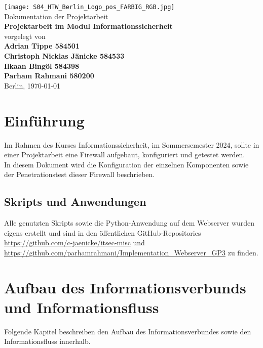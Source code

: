 \documentclass[
    a4paper,
    pagesize,
	pdftex,
    12pt,
]{scrartcl}
\begin{document}
\begin{titlepage}
    \begin{center}
        \texttt{[image: S04\_HTW\_Berlin\_Logo\_pos\_FARBIG\_RGB.jpg]} \\
        \vspace{1.0cm}
        Dokumentation der Projektarbeit \\
        \vspace{1.5cm}   
        \textbf{Projektarbeit im Modul Informationssicherheit} \\
        \vspace{1.5cm}
        vorgelegt von \\
        \textbf{Adrian Tippe 584501} \\
        \textbf{Christoph Nicklas Jänicke 584533} \\
        \textbf{Ilkaan Bingöl 584398} \\
        \textbf{Parham Rahmani 580200} \\
        \vspace{1.5cm}    
        Berlin, \today\\
    \end{center}
\end{titlepage}


\thispagestyle{empty}
\tableofcontents
\newpage


\section{Einführung}
Im Rahmen  des  Kurses Informationssicherheit,  im Sommersemester 2024, sollte in einer Projektarbeit eine Firewall aufgebaut,  konfiguriert  und getestet werden. \\
In  diesem Dokument wird die Konfiguration  der  einzelnen Komponenten sowie der Penetrationstest dieser Firewall beschrieben.

\subsection{Skripts und Anwendungen}
Alle genutzten Skripts sowie die Python-Anwendung auf dem Webserver wurden eigens erstellt und sind in den öffentlichen GitHub-Repositories \url{https://github.com/c-jaenicke/itsec-misc} und \url{https://github.com/parhamrahmani/Implementation_Webserver_GP3} zu finden.

\newpage
\section{Aufbau des Informationsverbunds und Informationsfluss}
Folgende Kapitel beschreiben den Aufbau des Informationsverbundes  sowie den Informationsfluss innerhalb.
\end{document}
